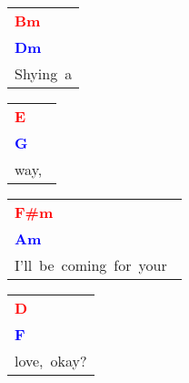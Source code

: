 \documentclass[12pt,a4paper,openany,UTF8]{memoir}
\begin{document}
\begin{tabular}[b]{l}
    \textbf{\textcolor{red}{Bm\ }}\\\textbf{\textcolor{blue}{Dm\ }}\\
    Shying~a\mbox{}\end{tabular}\begin{tabular}[b]{l}
    \textbf{\textcolor{red}{E\ }}\\\textbf{\textcolor{blue}{G\ }}\\
    way,~\mbox{}\end{tabular}\begin{tabular}[b]{l}
    \textbf{\textcolor{red}{F\#m\ }}\\\textbf{\textcolor{blue}{Am\ }}\\
    I'll~be~coming~for~your~\mbox{}\end{tabular}\begin{tabular}[b]{l}
    \textbf{\textcolor{red}{D\ }}\\\textbf{\textcolor{blue}{F\ }}\\
    love,~okay?\mbox{}\end{tabular}

    \vspace{\parskip}
\end{document}
